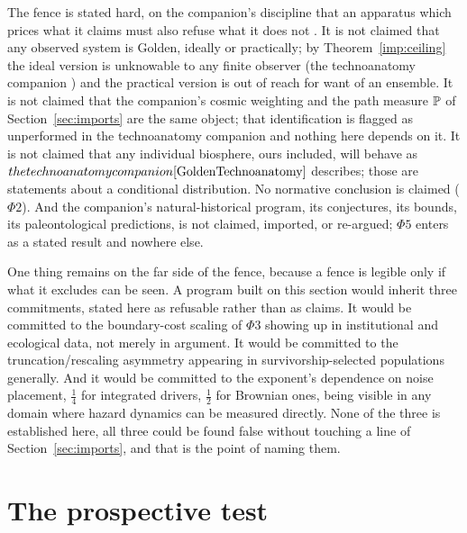 The fence is stated hard, on the companion's discipline that an
apparatus which prices what it claims must also refuse what it does not
\cite{AethusOptimalEarth}. It is not claimed that any observed system is Golden, ideally or
practically; by Theorem~\ref{imp:ceiling} the ideal version is
unknowable to any finite observer (the technoanatomy companion \cite{GoldenTechnoanatomy}) and
the practical version is out of reach for want of an ensemble. It is not claimed that the companion's cosmic
weighting and the path measure $\mathbb{P}$ of
Section~\ref{sec:imports} are the same object; that
identification is flagged as unperformed in
the technoanatomy companion \cite{GoldenTechnoanatomy} and nothing here depends on it. It is not
claimed that any individual biosphere, ours included, will behave as
$the technoanatomy companion \cite{GoldenTechnoanatomy}$ describes; those are statements about a
conditional distribution. No normative conclusion is claimed
($\Phi2$). And the companion's natural-historical program, its
conjectures, its bounds, its paleontological predictions, is not
claimed, imported, or re-argued; $\Phi5$ enters as a stated result and
nowhere else.

One thing remains on the far side of the fence, because a fence is
legible only if what it excludes can be seen. A program built on this
section would inherit three commitments, stated here as refusable rather
than as claims. It would be committed to the boundary-cost scaling of
$\Phi3$ showing up in institutional and ecological data, not merely in
argument. It would be committed to the truncation/rescaling asymmetry
appearing in survivorship-selected populations generally. And it would
be committed to the exponent's dependence on noise placement, $\tfrac14$
for integrated drivers, $\tfrac12$ for Brownian ones, being visible
in any domain where hazard dynamics can be measured directly. None of
the three is established here, all three could be found false without
touching a line of Section~\ref{sec:imports}, and that is the
point of naming them.


\section{The prospective test}\label{sec:protocol}


